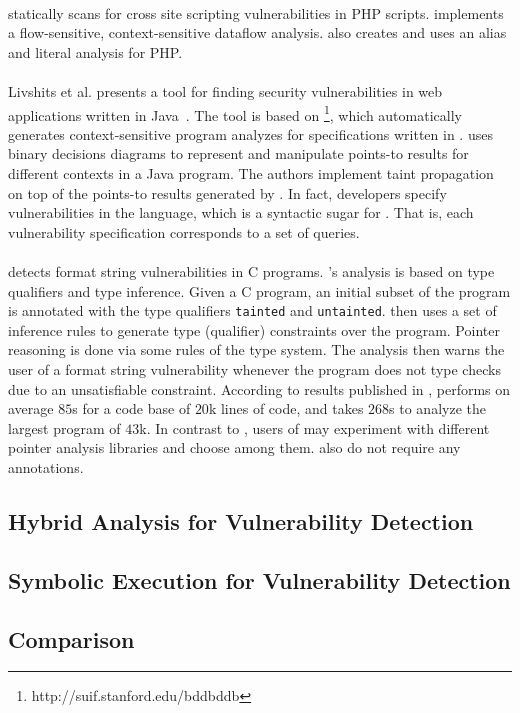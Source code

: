 \paragraph{\pixy}\cite{Jovanovic:2006:Pixy} statically scans
for cross site scripting vulnerabilities in PHP scripts. \pixy
implements a flow-sensitive, context-sensitive dataflow analysis.
\pixy also creates and uses an alias and literal analysis for PHP.

\paragraph{}Livshits et al. presents a tool for finding
security vulnerabilities in web applications written in Java~\cite{livshits05finding}.
The tool is based on \bddbddb\footnote{http://suif.stanford.edu/bddbddb},
which automatically generates context-sensitive program analyzes
for specifications written in \datalog\cite{Ullman:1988:datalog}.
\bddbddb uses binary decisions diagrams to represent and manipulate
points-to results for different contexts in a Java program. The authors
implement taint propagation on top of the points-to results generated
by \bddbddb.
In fact, developers specify vulnerabilities in the \pql
language\cite{Martin:2005:PQL}, which is a syntactic sugar for \datalog. 
That is, each vulnerability specification corresponds to a set of
\pql queries.

\paragraph{\cqual}\cite{Shankar:2001:DFS} detects format string
vulnerabilities in C programs. \cqual's analysis is based on type
qualifiers\cite{Foster:1999:TTQ} and type inference. Given a C program,
an initial subset of the program is annotated with the type qualifiers
\texttt{tainted} and \texttt{untainted}. \cqual then uses a set of
inference rules to generate type (qualifier) constraints over the program.
Pointer reasoning is done via some rules of the type system.
The analysis then warns the user of a format string vulnerability
whenever the program does not type checks due to an unsatisfiable
constraint. According to results published in \cite{Shankar:2001:DFS},
\cqual performs on average $85$s for a code base of $20$k lines of code,
and takes $268$s to analyze the largest program of $43$k.
In contrast to \cqual, users of \waint may experiment with different pointer
analysis libraries and choose among them. \waint also do not require
any annotations.


\subsection{Hybrid Analysis for Vulnerability Detection}
 \cite{Trip:2011:HAJSA}

\subsection{Symbolic Execution for Vulnerability Detection}

\subsection{Comparison}

